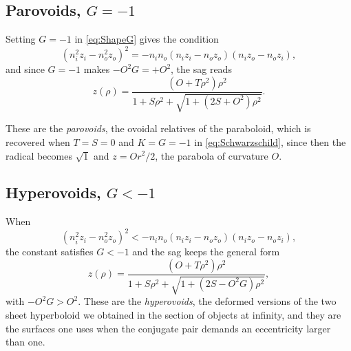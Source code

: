             \subsection{Parovoids, \texorpdfstring{$G=-1$}{G = -1}}

                Setting $G=-1$ in \ref{eq:ShapeG} gives the condition
                \begin{equation}\label{eq:ParovoidCondition}
                    \left( n_i^2z_i - n_o^2z_o \right)^2 = -n_in_o\left( n_iz_i - n_oz_o \right)\left( n_iz_o - n_oz_i \right),
                \end{equation}
                and since $G=-1$ makes $-O^2G = +O^2$, the sag reads
                \begin{equation}\label{eq:Parovoid}
                    z(\rho) = \frac{\left( O+T\rho^2 \right)\rho^2}{1 + S\rho^2 + \sqrt{1 + \left( 2S + O^2 \right)\rho^2}}.
                \end{equation}

                These are the \emph{parovoids}, the ovoidal relatives of the paraboloid, which is recovered when $T=S=0$ and $K=G=-1$ in \ref{eq:Schwarzschild}, since then the radical becomes $\sqrt{1}$ and $z = Or^2/2$, the parabola of curvature $O$.

            \subsection{Hyperovoids, \texorpdfstring{$G<-1$}{G < -1}}

                When
                \begin{equation}\label{eq:HyperovoidCondition}
                    \left( n_i^2z_i - n_o^2z_o \right)^2 < -n_in_o\left( n_iz_i - n_oz_o \right)\left( n_iz_o - n_oz_i \right),
                \end{equation}
                the constant satisfies $G<-1$ and the sag keeps the general form
                \begin{equation}\label{eq:Hyperovoid}
                    z(\rho) = \frac{\left( O+T\rho^2 \right)\rho^2}{1 + S\rho^2 + \sqrt{1 + \left( 2S - O^2G \right)\rho^2}},
                \end{equation}
                with $-O^2G>O^2$. These are the \emph{hyperovoids}, the deformed versions of the two sheet hyperboloid we obtained in the section of objects at infinity, and they are the surfaces one uses when the conjugate pair demands an eccentricity larger than one.

